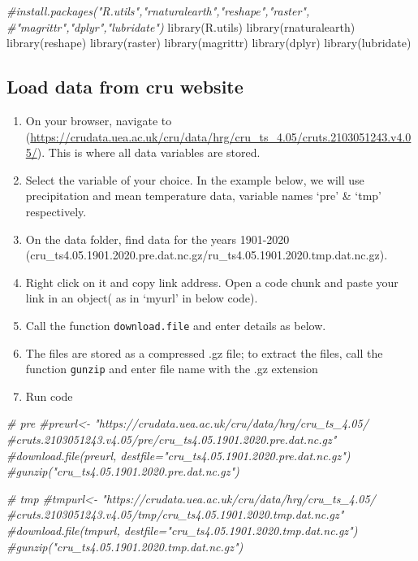 \documentclass[
]{book}
\newenvironment{Shaded}{\begin{snugshade}}{\end{snugshade}}
\newcommand{\CommentTok}[1]{\textcolor[rgb]{0.56,0.35,0.01}{\textit{#1}}}
\newcommand{\FunctionTok}[1]{\textcolor[rgb]{0.00,0.00,0.00}{#1}}
\newcommand{\NormalTok}[1]{#1}
\providecommand{\tightlist}{%
  \setlength{\itemsep}{0pt}\setlength{\parskip}{0pt}}
\begin{document}
\begin{Shaded}
\begin{Highlighting}[]
\CommentTok{\#install.packages("R.utils","rnaturalearth","reshape","raster",}
\CommentTok{\#"magrittr","dplyr","lubridate")}
\FunctionTok{library}\NormalTok{(R.utils)}
\FunctionTok{library}\NormalTok{(rnaturalearth)}
\FunctionTok{library}\NormalTok{(reshape)}
\FunctionTok{library}\NormalTok{(raster)}
\FunctionTok{library}\NormalTok{(magrittr)}
\FunctionTok{library}\NormalTok{(dplyr)}
\FunctionTok{library}\NormalTok{(lubridate)}
\end{Highlighting}
\end{Shaded}

\hypertarget{load-data-from-cru-website}{%
\subsection{Load data from cru website}\label{load-data-from-cru-website}}

\begin{enumerate}
\def\labelenumi{\arabic{enumi}.}
\tightlist
\item
  On your browser, navigate to (\url{https://crudata.uea.ac.uk/cru/data/hrg/cru_ts_4.05/cruts.2103051243.v4.05/}). This is where all data variables are stored.
\item
  Select the variable of your choice. In the example below, we will use precipitation and mean temperature data, variable names `pre' \& `tmp' respectively.
\item
  On the data folder, find data for the years 1901-2020
  (cru\_ts4.05.1901.2020.pre.dat.nc.gz/ru\_ts4.05.1901.2020.tmp.dat.nc.gz).
\item
  Right click on it and copy link address. Open a code chunk and paste your link in an object( as in `myurl' in below code).
\item
  Call the function \texttt{download.file} and enter details as below.
\item
  The files are stored as a compressed .gz file; to extract the files, call the function \texttt{gunzip} and enter file name with the .gz extension
\item
  Run code
\end{enumerate}

\begin{Shaded}
\begin{Highlighting}[]
\CommentTok{\# pre}
\CommentTok{\#preurl\textless{}{-} "https://crudata.uea.ac.uk/cru/data/hrg/cru\_ts\_4.05/}
\CommentTok{\#cruts.2103051243.v4.05/pre/cru\_ts4.05.1901.2020.pre.dat.nc.gz"}
\CommentTok{\#download.file(preurl, destfile="cru\_ts4.05.1901.2020.pre.dat.nc.gz")}
\CommentTok{\#gunzip("cru\_ts4.05.1901.2020.pre.dat.nc.gz")}

\CommentTok{\# tmp}
\CommentTok{\#tmpurl\textless{}{-} "https://crudata.uea.ac.uk/cru/data/hrg/cru\_ts\_4.05/}
\CommentTok{\#cruts.2103051243.v4.05/tmp/cru\_ts4.05.1901.2020.tmp.dat.nc.gz"}
\CommentTok{\#download.file(tmpurl, destfile="cru\_ts4.05.1901.2020.tmp.dat.nc.gz")}
\CommentTok{\#gunzip("cru\_ts4.05.1901.2020.tmp.dat.nc.gz")}
\end{Highlighting}
\end{Shaded}
\end{document}
